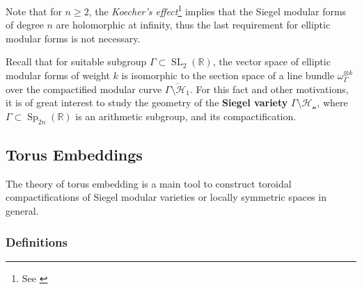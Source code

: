 \documentclass[11pt,english]{smfart}
\theoremstyle{definition}
\theoremstyle{remark}
\newcommand{\R}{\mathbb{R}}
\DeclareMathOperator{\SL}{SL}
\DeclareMathOperator{\Sp}{Sp}
\newcommand{\under}{\!\setminus\!}
\renewcommand{\bar}{\overline}
\begin{document}
Note that for $n\ge 2$, the \textit{Koecher's effect}\footnote{See \cite{AA09}} implies that the Siegel modular forms of degree $n$ are holomorphic at infinity, thus the last requirement for elliptic modular forms is not necessary. 

Recall that for suitable subgroup $\Gamma\subset\SL_2(\R)$,
the vector space of elliptic modular forms of weight $k$ is isomorphic to the section space of a line bundle $\omega_{\Gamma}^{\otimes k}$ over the compactified modular curve $\bar{\Gamma\under\mathcal{H}_1}$.
For this fact and other motivations, it is of great interest to study the geometry of the \textbf{Siegel variety} $\Gamma\under\mathcal{H_n}$, where $\Gamma\subset \Sp_{2n}(\R)$ is an arithmetic subgroup, and its compactification.

\subsection{Torus Embeddings}
The theory of torus embedding is a main tool to construct toroidal compactifications of Siegel modular varieties or locally symmetric spaces in general.
\subsubsection{Definitions}
\end{document}
